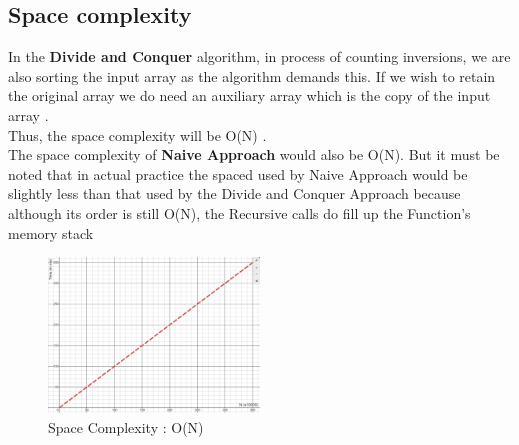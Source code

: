 \documentclass[conference]{IEEEtran}
\begin{document}
\subsection{Space complexity}
\noindent In the \textbf{Divide and Conquer} algorithm, in process of counting inversions, we are also sorting the input array as the algorithm demands this. If we wish to retain the original array we do need an auxiliary array which is the copy of the input array .\\ Thus, the space complexity will be O(N) .\\
The space complexity of \textbf{Naive Approach} would also be O(N). But it must be noted that in actual practice the spaced used by Naive Approach would be slightly less than that used by the Divide and Conquer Approach because although its order is still O(N), the Recursive calls do fill up the Function's memory stack\\
\begin{figure}[htbp]
\includegraphics[width=0.5\textwidth]{spaceComplexity.png}
\caption{Space Complexity : O(N)}
\label{Space Complexity}
\end{figure}

\begin{thebibliography}{00}
\\
\\
\end{thebibliography}
\vspace{12pt}
\end{document}
